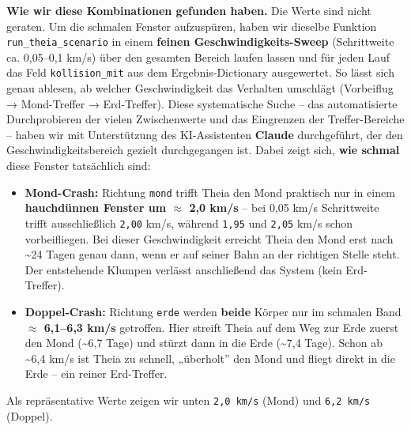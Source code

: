 \documentclass[11pt]{article}
\providecommand{\tightlist}{%
      \setlength{\itemsep}{0pt}\setlength{\parskip}{0pt}}
\begin{document}
\textbf{Wie wir diese Kombinationen gefunden haben.} Die Werte sind
nicht geraten. Um die schmalen Fenster aufzuspüren, haben wir dieselbe
Funktion \texttt{run\_theia\_scenario} in einem \textbf{feinen
Geschwindigkeits-Sweep} (Schrittweite ca. 0,05--0,1 km/s) über den
gesamten Bereich laufen lassen und für jeden Lauf das Feld
\texttt{kollision\_mit} aus dem Ergebnis-Dictionary ausgewertet. So
lässt sich genau ablesen, ab welcher Geschwindigkeit das Verhalten
umschlägt (Vorbeiflug → Mond-Treffer → Erd-Treffer). Diese systematische
Suche -- das automatisierte Durchprobieren der vielen Zwischenwerte und
das Eingrenzen der Treffer-Bereiche -- haben wir mit Unterstützung des
KI-Assistenten \textbf{Claude} durchgeführt, der den
Geschwindigkeitsbereich gezielt durchgegangen ist. Dabei zeigt sich,
\textbf{wie schmal} diese Fenster tatsächlich sind:

\begin{itemize}
\tightlist
\item
  \textbf{Mond-Crash:} Richtung \texttt{mond} trifft Theia den Mond
  praktisch nur in einem \textbf{hauchdünnen Fenster um $\approx$ 2,0 km/s} --
  bei 0,05 km/s Schrittweite trifft ausschließlich \texttt{2,00} km/s,
  während \texttt{1,95} und \texttt{2,05} km/s schon vorbeifliegen. Bei
  dieser Geschwindigkeit erreicht Theia den Mond erst nach
  \textasciitilde24 Tagen genau dann, wenn er auf seiner Bahn an der
  richtigen Stelle steht. Der entstehende Klumpen verlässt anschließend
  das System (kein Erd-Treffer).
\item
  \textbf{Doppel-Crash:} Richtung \texttt{erde} werden \textbf{beide}
  Körper nur im schmalen Band \textbf{$\approx$ 6,1--6,3 km/s} getroffen. Hier
  streift Theia auf dem Weg zur Erde zuerst den Mond (\textasciitilde6,7
  Tage) und stürzt dann in die Erde (\textasciitilde7,4 Tage). Schon ab
  \textasciitilde6,4 km/s ist Theia zu schnell, „überholt'' den Mond und
  fliegt direkt in die Erde -- ein reiner Erd-Treffer.
\end{itemize}

Als repräsentative Werte zeigen wir unten \texttt{2,0\ km/s} (Mond) und
\texttt{6,2\ km/s} (Doppel).
\end{document}
